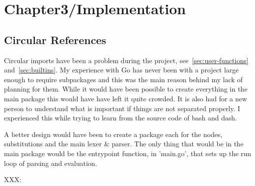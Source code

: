 \chapter{Chapter3/Implementation}










\section{Circular References}
\label{sec:circular-refs}
Circular imports have been a problem during the project, see~\ref{sec:user-functions} and~\ref{sec:builtins}.
My experience with Go has never been with a project large enough to require subpackages and this was the main reason behind my lack of planning for them.
While it would have been possible to create everything in the main package this would have have left it quite crowded.
It is also had for a new person to understand what is important if things are not separated properly.
I experienced this while trying to learn from the source code of bash and dash.

A better design would have been to create a package each for the nodes, substitutions and the main lexer \& parser.
The only thing that would be in the main package would be the entrypoint function, in 'main.go', that sets up the run loop of parsing and evaluation.

XXX: